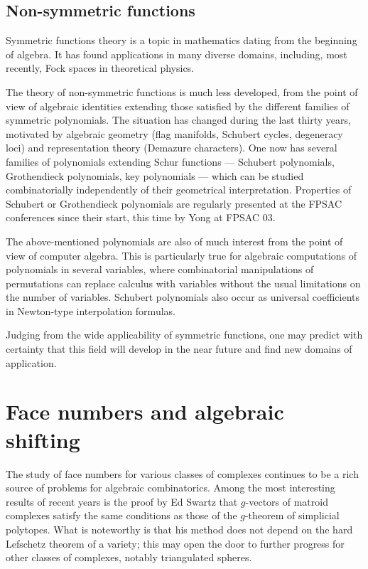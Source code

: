 \documentclass{amsart}
\begin{document}
\subsection{Non-symmetric functions}
Symmetric functions theory is a topic in mathematics dating from the
beginning of algebra. It has found applications in many 
diverse domains,
including, most recently, Fock spaces in theoretical physics. 

The theory of non-symmetric functions is much
less developed, from the
point of view of algebraic identities extending those satisfied by the
different families of symmetric polynomials.  The situation has
changed during the last thirty years, motivated by algebraic geometry
(flag manifolds, Schubert cycles, degeneracy loci) and representation
theory (Demazure characters).  One now has several families of
polynomials extending Schur functions --- Schubert polynomials,
Grothendieck polynomials, key polynomials --- which can be studied
combinatorially independently of their geometrical interpretation.
Properties of Schubert or Grothendieck polynomials are regularly
presented at the FPSAC conferences since their start, this time by
Yong at FPSAC 03.

The above-mentioned polynomials are also of much interest from the point 
of view of computer algebra.
This is particularly true for algebraic computations of
polynomials in several variables, where combinatorial manipulations of
permutations can replace calculus with variables without the usual
limitations on the number of variables. Schubert polynomials also
occur as universal coefficients in Newton-type interpolation formulas.

Judging from the wide 
applicability of symmetric functions, one may
predict with certainty that this field will develop in the near future
and find new domains of application.


\section{Face numbers  and algebraic shifting}

The study of face numbers for various classes of complexes continues
to be a rich source of problems for algebraic combinatorics.
Among the most interesting results of recent years is the proof
by Ed Swartz that $g$-vectors of matroid complexes satisfy 
the same conditions as those of the $g$-theorem of simplicial
polytopes. What is noteworthy is that his method does not depend on the
hard Lefschetz theorem of a variety; this may open the door to
further progress for other classes of complexes, 
notably triangulated spheres.
\end{document}
